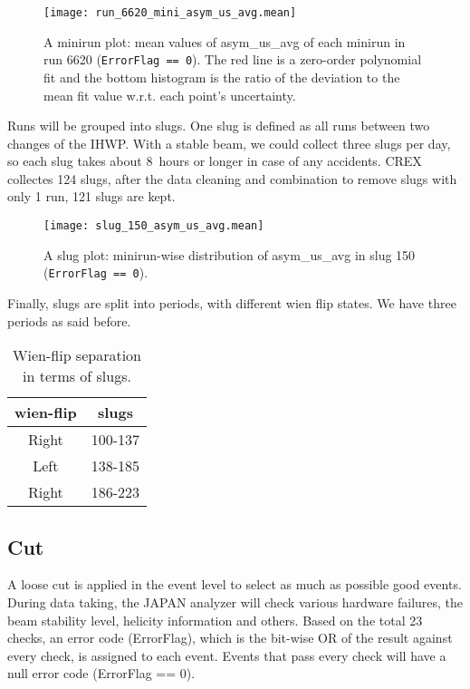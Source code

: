 \begin{figure}[!h]
    \centering
    \texttt{[image: run\_6620\_mini\_asym\_us\_avg.mean]}
    \caption{A minirun plot: mean values of asym\_us\_avg of each minirun in 
    run 6620 (\texttt{ErrorFlag == 0}).
    The red line is a zero-order polynomial fit and the bottom histogram is
    the ratio of the deviation to the mean fit value w.r.t. each point's uncertainty.
    }
\end{figure}

Runs will be grouped into slugs. One slug is defined as all runs between two
changes of the IHWP. With a stable beam, we could collect three slugs per day, so 
each slug takes about 8~hours or longer in case of any accidents. CREX collectes
124 slugs, after the data cleaning and combination to remove slugs with only 1 run, 
121 slugs are kept.
\begin{figure}[!h]
    \centering
    \texttt{[image: slug\_150\_asym\_us\_avg.mean]}
    \caption{A slug plot: minirun-wise distribution of asym\_us\_avg in slug 150 
    (\texttt{ErrorFlag == 0}).}
\end{figure}

Finally, slugs are split into periods, with different wien flip states. 
We have three periods as said before.
\begin{table}[!h]
    \centering
    \begin{tabular}{c | c}
	\hline
	wien-flip   & slugs \\
	\hline
	Right	& 100-137   \\
	Left	& 138-185   \\
	Right	& 186-223   \\
	\hline
    \end{tabular}
    \caption{Wien-flip separation in terms of slugs.}
\end{table}

\subsection{Cut}
A loose cut is applied in the event level to select as much as possible good events.
During data taking, the JAPAN analyzer will check various hardware failures, the
beam stability level, helicity information and others. Based on the total 23 checks,
an error code (ErrorFlag), which is the bit-wise OR of the result against every
check, is assigned to each event. Events that pass every check will have
a null error code (ErrorFlag == 0). 

